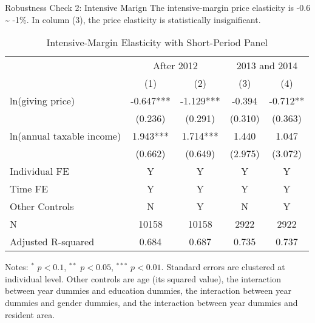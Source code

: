 \documentclass[
  ignorenonframetext,
  aspectratio=169,
]{beamer}
\begin{document}
\begin{frame}{Robustness Check 2: Intensive Marign}
\protect\hypertarget{robustness-check-2-intensive-marign}{}
The intensive-margin price elasticity is -0.6 \textasciitilde{} -1\%.
In column (3), the price elasticity is statistically insignificant.

\begin{table}

\caption{\label{tab:ShortIntensive}Intensive-Margin Elasticity with Short-Period Panel}
\centering
\fontsize{7}{9}\selectfont
\begin{threeparttable}
\begin{tabular}[t]{lcccc}
\toprule
\multicolumn{1}{c}{ } & \multicolumn{2}{c}{After 2012} & \multicolumn{2}{c}{2013 and 2014} \\
\cmidrule(l{3pt}r{3pt}){2-3} \cmidrule(l{3pt}r{3pt}){4-5}
 & (1) & (2) & (3) & (4)\\
\midrule
ln(giving price) & -0.647*** & -1.129*** & -0.394 & -0.712**\\
 & (0.236) & (0.291) & (0.310) & (0.363)\\
ln(annual taxable income) & 1.943*** & 1.714*** & 1.440 & 1.047\\
 & (0.662) & (0.649) & (2.975) & (3.072)\\
Individual FE & Y & Y & Y & Y\\
Time FE & Y & Y & Y & Y\\
Other Controls & N & Y & N & Y\\
N & 10158 & 10158 & 2922 & 2922\\
Adjusted R-squared & 0.684 & 0.687 & 0.735 & 0.737\\
\bottomrule
\end{tabular}
\begin{tablenotes}
\item Notes: $^{*}$ $p < 0.1$, $^{**}$ $p < 0.05$, $^{***}$ $p < 0.01$. Standard errors are clustered at individual level. Other controls are age (its squared value), the interaction between year dummies and education dummies, the interaction between year dummies and gender dummies, and the interaction between year dummies and resident area.
\end{tablenotes}
\end{threeparttable}
\end{table}
\end{frame}
\end{document}
